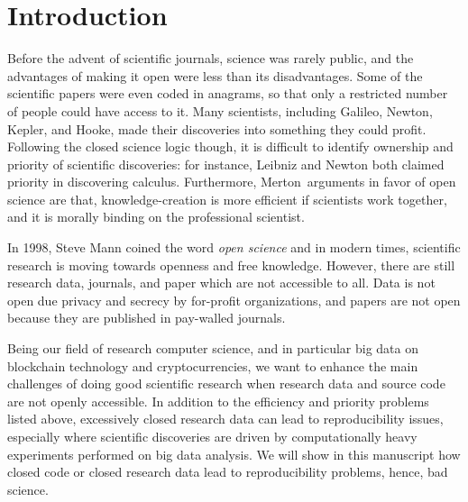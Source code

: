 \section{Introduction}
Before the advent of scientific journals, science was rarely public, and the advantages of making
it open were less than its disadvantages. Some of the scientific papers were
even coded in anagrams, so that only a restricted number of people could have access to it.
Many scientists, including Galileo, Newton, Kepler, and Hooke, made their discoveries into
something they could profit. Following the closed science logic though, it is difficult
to identify ownership and priority of scientific discoveries: for instance,
Leibniz and Newton both claimed priority in discovering calculus. Furthermore,
Merton\,\cite{merton1942science} arguments in favor of open science are
that, knowledge-creation is more efficient if scientists work together, and
it is morally binding on the professional scientist.


In 1998, Steve Mann coined the word \emph{open science} and
in modern times, scientific research is moving towards openness and free knowledge.
However, there are still research data, journals, and paper which are not accessible to all.
Data is not open due privacy and secrecy by for-profit organizations, and
papers are not open because they are published in pay-walled journals.

Being our field of research computer science, and in particular
big data on blockchain technology and cryptocurrencies,
we want to enhance the main challenges of doing good scientific
research when research data and source code are not openly accessible.
In addition to the efficiency and priority problems listed above, excessively closed research data
can lead to reproducibility issues, especially where scientific discoveries are driven by
computationally heavy experiments performed on big data analysis.
%
We will show in this manuscript how closed code or closed
research data lead to reproducibility problems, hence, bad science.

